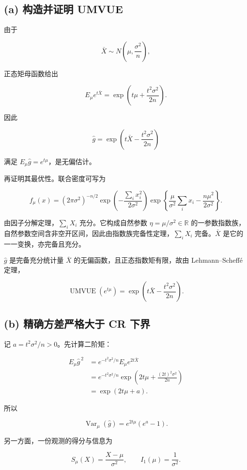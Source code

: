 \subsection{(a) 构造并证明 UMVUE}

由于

\[
\bar X\sim N\left(\mu,\frac{\sigma^2}{n}\right),
\]

正态矩母函数给出

\[
E_\mu e^{t\bar X}
=\exp\left(t\mu+\frac{t^2\sigma^2}{2n}\right).
\]

因此

\[
\widehat g
=\exp\left(t\bar X-\frac{t^2\sigma^2}{2n}\right)
\]

满足 $E_\mu\widehat g=e^{t\mu}$，是无偏估计。

再证明其最优性。联合密度可写为

\[
f_\mu(x)
=(2\pi\sigma^2)^{-n/2}
\exp\left(-\frac{\sum_i x_i^2}{2\sigma^2}\right)
\exp\left\{\frac{\mu}{\sigma^2}\sum_i x_i
-\frac{n\mu^2}{2\sigma^2}\right\}.
\]

由因子分解定理，$\sum_iX_i$ 充分。它构成自然参数 $\eta=\mu/\sigma^2\in\mathbb R$ 的一参数指数族，自然参数空间含非空开区间，因此由指数族完备性定理，$\sum_iX_i$ 完备。$\bar X$ 是它的一一变换，亦完备且充分。

$\widehat g$ 是完备充分统计量 $\bar X$ 的无偏函数，且正态指数矩有限，故由 Lehmann--Scheffé 定理，

\[
\boxed{\operatorname{UMVUE}(e^{t\mu})
=\exp\left(t\bar X-\frac{t^2\sigma^2}{2n}\right).}
\]

\subsection{(b) 精确方差严格大于 CR 下界}

记 $a=t^2\sigma^2/n>0$。先计算二阶矩：

\[
\begin{aligned}
E_\mu\widehat g^{\,2}
&=e^{-t^2\sigma^2/n}E_\mu e^{2t\bar X}\\
&=e^{-t^2\sigma^2/n}
\exp\left(2t\mu+\frac{(2t)^2\sigma^2}{2n}\right)\\
&=\exp(2t\mu+a).
\end{aligned}
\]

所以

\[
\boxed{\operatorname{Var}_\mu(\widehat g)
=e^{2t\mu}(e^a-1).}
\]

另一方面，一份观测的得分与信息为

\[
S_\mu(X)=\frac{X-\mu}{\sigma^2},
\qquad I_1(\mu)=\frac1{\sigma^2}.
\]

